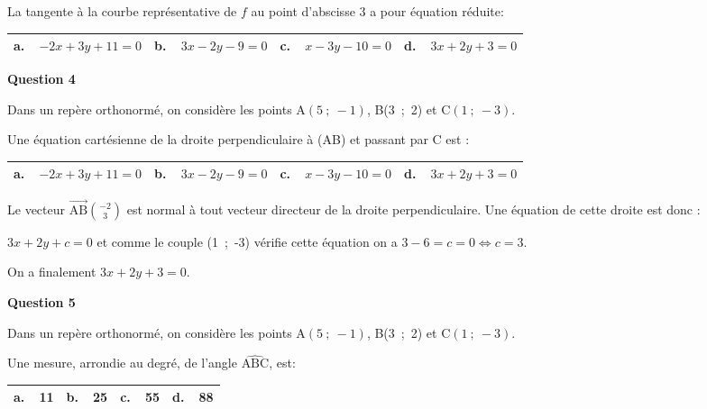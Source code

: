 \documentclass[10pt]{article}
\providecommand{\vect}[1]{\overrightarrow{#1}}
\begin{document}
La tangente à la courbe représentative de $f$ au point d'abscisse 3 a pour équation réduite:

\begin{center}
\begin{tabularx}{\linewidth}{|*{4}{X|}}\hline
\textbf{a.~~}$-2x + 3y + 11 = 0$&\textbf{b.~~}$3x - 2y - 9 = 0$&\textbf{c.~~}$x - 3y - 10 = 0$&\textbf{d.~~}$3x +2y +3 = 0$\\ \hline
\end{tabularx}
\end{center} 

\bigskip

\textbf{Question 4}

\medskip

Dans un repère orthonormé, on considère les points A$(5~;~-1)$, B(3~;~2) et C$(1~;~-3)$.

Une équation cartésienne de la droite perpendiculaire à (AB) et passant par C est :
 
\begin{center}
\begin{tabularx}{\linewidth}{|*{4}{X|}}\hline
\textbf{a.~~}$-2x + 3y + 11 = 0$&\textbf{b.~~}$3x - 2y - 9 = 0$&\textbf{c.~~}$x - 3y - 10 = 0$&\textbf{d.~~}$3x +2y +3 = 0$\\ \hline
\end{tabularx}
\end{center} 
Le vecteur $\vect{\text{AB}}\binom{-2}{3}$ est normal à tout vecteur directeur de la droite perpendiculaire. Une équation de cette droite est donc :

$3x + 2y + c = 0$ et comme le couple (1~;~-3) vérifie cette équation on a $3 - 6 = c = 0 \iff c  = 3$.

On a finalement $3x + 2y + 3 = 0$. 
\bigskip

\textbf{Question 5}

\medskip

Dans un repère orthonormé, on considère les points A$(5~;~-1)$, B(3~;~2) et C$(1~;~-3)$.

Une mesure, arrondie au degré, de l'angle $\widehat{\text{ABC}}$, est:

\begin{center}
\begin{tabularx}{\linewidth}{|*{4}{X|}}\hline
\textbf{a.~~}11&\textbf{b.~~}25&\textbf{c.~~}55&\textbf{d.~~}88\\ \hline
\end{tabularx}
\end{center} 

\bigskip
\end{document}
